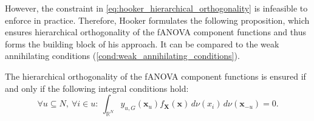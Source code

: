 However, the constraint in \autoref{eq:hooker_hierarchical_orthogonality} is infeasible to enforce in practice.
Therefore, Hooker formulates the following proposition, which ensures hierarchical orthogonality of the fANOVA component functions and thus forms the building block of his approach. It can be compared to the weak annihilating conditions (\autoref{cond:weak_annihilating_conditions}).
\begin{proposition}\label{prop:hooker_lemma_1}
    The hierarchical orthogonality of the fANOVA component functions is ensured if and only if the following integral conditions hold:
    \begin{equation}
\forall u \subseteq N,\ \forall i \in u:\ \int_{\mathbb{R}^N} y_{u, G}(\boldsymbol{x}_u) f_{\boldsymbol{X}}(\boldsymbol{x})\, d \nu (x_i)\, d \nu (\boldsymbol{x}_{-u}) = 0.
\end{equation}
\end{proposition}
